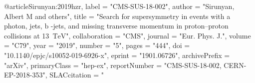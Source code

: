 

@article{Sirunyan:2019hzr,
      label          = "CMS-SUS-18-002",
      author         = "Sirunyan, Albert M and others",
      title          = "{Search for supersymmetry in events with a photon, jets,
                        $\mathrm {b}$ -jets, and missing transverse momentum in
                        proton--proton collisions at 13 $\,\text {Te}\text {V}$}",
      collaboration  = "CMS",
      journal        = "Eur. Phys. J.",
      volume         = "C79",
      year           = "2019",
      number         = "5",
      pages          = "444",
      doi            = "10.1140/epjc/s10052-019-6926-x",
      eprint         = "1901.06726",
      archivePrefix  = "arXiv",
      primaryClass   = "hep-ex",
      reportNumber   = "CMS-SUS-18-002, CERN-EP-2018-353",
      SLACcitation   = "%
}

